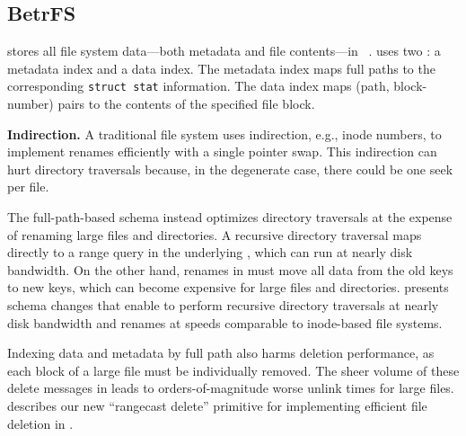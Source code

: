 

\subsection{BetrFS}

\betrfs stores all file system data---both metadata and file
contents---in \bets~\cite{JannenYuZh15tos}.  \betrfs uses two \bets: a
metadata index and a data index.  The metadata index maps full paths
to the corresponding \texttt{struct stat} information.  The data index maps (path,
block-number) pairs to the contents of the specified file block.

\vspace{5pt}
\noindent \textbf{Indirection.}
A traditional file system uses indirection, e.g., inode numbers, to implement renames efficiently with a
single pointer swap.
This indirection can hurt directory traversals
because, in the degenerate case, there could be one seek per file.


The \betrfs full-path-based schema instead optimizes directory traversals at the expense of
renaming large files and directories.  A recursive directory traversal
maps directly to a range query in the underlying \bet, which can run
at nearly disk bandwidth.  
%
%
%
On the other hand, renames in \betrfs must move all data from the old
keys to new keys, which can become expensive for large files and
directories.   presents schema changes that enable
\sysname{} to perform recursive directory traversals at nearly disk
bandwidth and renames at speeds comparable to inode-based file
systems.


%
%

Indexing data and metadata by full path also harms deletion performance,
as each block of a large file must be individually removed.
The sheer volume of these delete messages in \betrfs leads
to orders-of-magnitude worse unlink times for large files.
 describes our new ``rangecast delete'' primitive for
implementing efficient file deletion in \sysname{}.

